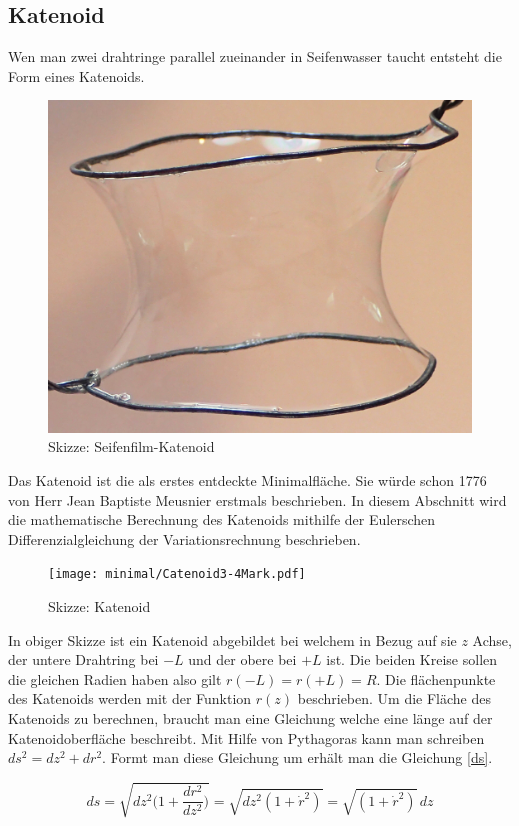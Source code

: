 \begin{refsection}
\subsection{Katenoid}
Wen man zwei drahtringe parallel zueinander in Seifenwasser taucht entsteht die Form eines Katenoids. 
\begin{figure}[H]
  \centering
  \includegraphics[scale=0.5]{minimal/Cartenoid_Foto.png}
  \caption{Skizze: Seifenfilm-Katenoid} 
\end{figure}
Das Katenoid ist die als erstes entdeckte Minimalfläche.
Sie würde schon 1776 von Herr Jean Baptiste Meusnier erstmals beschrieben.
In diesem Abschnitt wird die mathematische Berechnung des Katenoids mithilfe der Eulerschen Differenzialgleichung der Variationsrechnung beschrieben.
\begin{figure}[H]
  \centering
  \texttt{[image: minimal/Catenoid3-4Mark.pdf]}
  \caption{Skizze: Katenoid} 
\end{figure}
In obiger Skizze ist ein Katenoid abgebildet bei welchem in Bezug auf sie $z$ Achse, der untere Drahtring bei $-L$ und der obere bei $+L$ ist. 
Die beiden Kreise sollen die gleichen Radien haben also gilt $r(-L)=r(+L)=R$. Die flächenpunkte des Katenoids werden mit der Funktion $r(z)$ beschrieben. 
Um die Fläche des Katenoids zu berechnen, braucht man eine Gleichung welche eine länge auf der Katenoidoberfläche beschreibt. Mit Hilfe von Pythagoras kann man schreiben $ds^2=dz^2+dr^2$.
Formt man diese Gleichung um erhält man die Gleichung \eqref{ds}.

\begin{equation} \label{ds}
  ds=\sqrt{dz^2\bigg(1+\frac{dr^2}{dz^2}\bigg)}= \sqrt{dz^2(1+\dot r^2)}=\sqrt{(1+\dot r^2)}\,dz
\end{equation}

\end{refsection}
